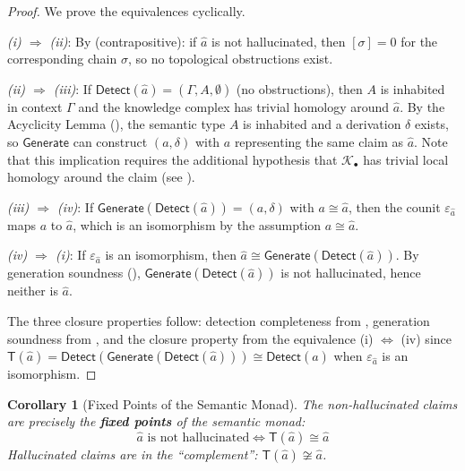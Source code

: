 \documentclass[11pt,a4paper]{article}
\theoremstyle{plain}
\newtheorem{corollary}[theorem]{Corollary}
\theoremstyle{definition}
\theoremstyle{remark}
\newcommand{\Detect}{\mathsf{Detect}}
\newcommand{\Generate}{\mathsf{Generate}}
\newcommand{\SemanticT}{\mathsf{T}}
\begin{document}
\begin{proof}
We prove the equivalences cyclically.

\emph{(i) $\Rightarrow$ (ii)}: By  (contrapositive): if $\hat{a}$ is not hallucinated, then $[\sigma] = 0$ for the corresponding chain $\sigma$, so no topological obstructions exist.

\emph{(ii) $\Rightarrow$ (iii)}: If $\Detect(\hat{a}) = (\Gamma, A, \emptyset)$ (no obstructions), then $A$ is inhabited in context $\Gamma$ and the knowledge complex has trivial homology around $\hat{a}$. By the Acyclicity Lemma (), the semantic type $A$ is inhabited and a derivation $\delta$ exists, so $\Generate$ can construct $(a, \delta)$ with $a$ representing the same claim as $\hat{a}$. Note that this implication requires the additional hypothesis that $\mathcal{K}_\bullet$ has trivial local homology around the claim (see ).

\emph{(iii) $\Rightarrow$ (iv)}: If $\Generate(\Detect(\hat{a})) = (a, \delta)$ with $a \cong \hat{a}$, then the counit $\varepsilon_{\hat{a}}$ maps $a$ to $\hat{a}$, which is an isomorphism by the assumption $a \cong \hat{a}$.

\emph{(iv) $\Rightarrow$ (i)}: If $\varepsilon_{\hat{a}}$ is an isomorphism, then $\hat{a} \cong \Generate(\Detect(\hat{a}))$. By generation soundness (), $\Generate(\Detect(\hat{a}))$ is not hallucinated, hence neither is $\hat{a}$.

The three closure properties follow: detection completeness from , generation soundness from , and the closure property from the equivalence (i) $\Leftrightarrow$ (iv) since $\SemanticT(\hat{a}) = \Detect(\Generate(\Detect(\hat{a}))) \cong \Detect(\hat{a})$ when $\varepsilon_{\hat{a}}$ is an isomorphism.
\end{proof}

\begin{corollary}[Fixed Points of the Semantic Monad]\label{cor:fixed-points}
The non-hallucinated claims are precisely the \textbf{fixed points} of the semantic monad:
\[
\hat{a} \text{ is not hallucinated} \iff \SemanticT(\hat{a}) \cong \hat{a}
\]
Hallucinated claims are in the ``complement'': $\SemanticT(\hat{a}) \not\cong \hat{a}$.
\end{corollary}


\end{document}
